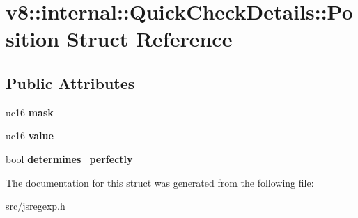 \hypertarget{structv8_1_1internal_1_1_quick_check_details_1_1_position}{}\section{v8\+:\+:internal\+:\+:Quick\+Check\+Details\+:\+:Position Struct Reference}
\label{structv8_1_1internal_1_1_quick_check_details_1_1_position}
\subsection*{Public Attributes}
\begin{DoxyCompactItemize}
\item 
\hypertarget{structv8_1_1internal_1_1_quick_check_details_1_1_position_aeb884849a8690bba0d4e9175d10af742}{}uc16 {\bfseries mask}\label{structv8_1_1internal_1_1_quick_check_details_1_1_position_aeb884849a8690bba0d4e9175d10af742}

\item 
\hypertarget{structv8_1_1internal_1_1_quick_check_details_1_1_position_af6100b18395071db66ec6c33f51e52d9}{}uc16 {\bfseries value}\label{structv8_1_1internal_1_1_quick_check_details_1_1_position_af6100b18395071db66ec6c33f51e52d9}

\item 
\hypertarget{structv8_1_1internal_1_1_quick_check_details_1_1_position_ad2a5c9be399371a2ebbbd56b483f2fd9}{}bool {\bfseries determines\+\_\+perfectly}\label{structv8_1_1internal_1_1_quick_check_details_1_1_position_ad2a5c9be399371a2ebbbd56b483f2fd9}

\end{DoxyCompactItemize}


The documentation for this struct was generated from the following file\+:\begin{DoxyCompactItemize}
\item 
src/jsregexp.\+h\end{DoxyCompactItemize}

